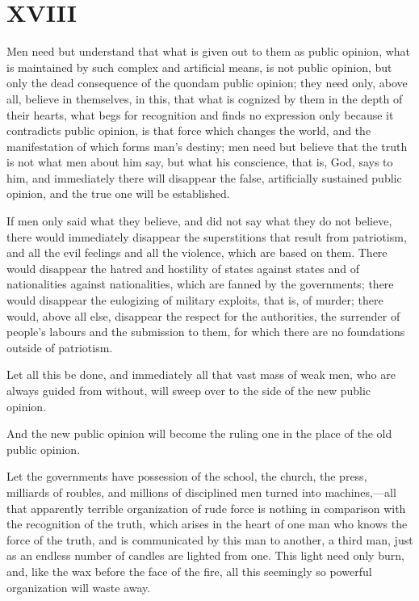 \documentclass{book}
\begin{document}
\chapter{XVIII}
\label{chapter-18}
Men need but understand that what is given out to them as public opinion, what is maintained by such complex and artificial means, is not public opinion, but only the dead consequence of the quondam public opinion; they need only, above all, believe in themselves, in this, that what is cognized by them in the depth of their hearts, what begs for recognition and finds no expression only because it contradicts public opinion, is that force which changes the world, and the manifestation of which forms man’s destiny; men need but believe that the truth is not what men about him say, but what his conscience, that is, God, says to him, and immediately there will disappear the false, artificially sustained public opinion, and the true one will be established.

If men only said what they believe, and did not say what they do not believe, there would immediately disappear the superstitions that result from patriotism, and all the evil feelings and all the violence, which are based on them. There would disappear the hatred and hostility of states against states and of nationalities against nationalities, which are fanned by the governments; there would disappear the eulogizing of military exploits, that is, of murder; there would, above all else, disappear the respect for the authorities, the surrender of people’s labours and the submission to them, for which there are no foundations outside of patriotism.

Let all this be done, and immediately all that vast mass of weak men, who are always guided from without, will sweep over to the side of the new public opinion.

And the new public opinion will become the ruling one in the place of the old public opinion.

Let the governments have possession of the school, the church, the press, milliards of roubles, and millions of disciplined men turned into machines,—all that apparently terrible organization of rude force is nothing in comparison with the recognition of the truth, which arises in the heart of one man who knows the force of the truth, and is communicated by this man to another, a third man, just as an endless number of candles are lighted from one. This light need only burn, and, like the wax before the face of the fire, all this seemingly so powerful organization will waste away.
\end{document}
